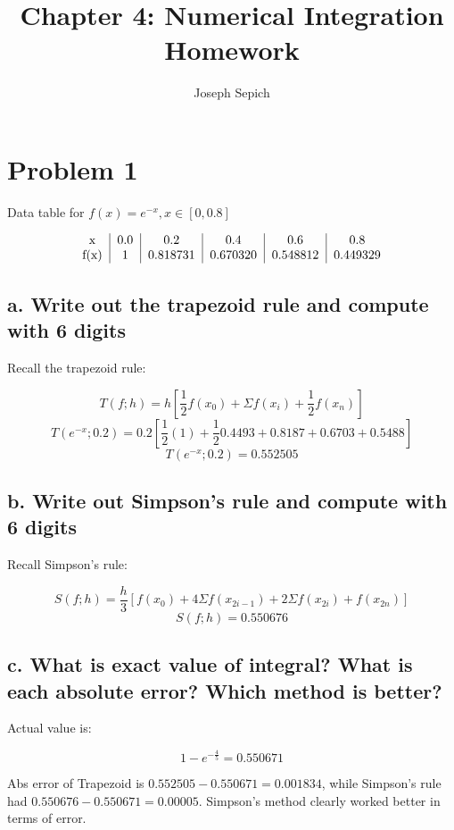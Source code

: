 \documentclass[]{article}
\title{Chapter 4: Numerical Integration Homework}
\subtitle{Joseph Sepich}
\author{}
\date{}
\begin{document}
\maketitle

{
\setcounter{tocdepth}{2}
\tableofcontents
}
\section{Problem 1}\label{problem-1}

Data table for \(f(x) = e^{-x}, x \in [0,0.8]\)

\[
\begin{tabular}{c|c|c|c|c|c}
x & 0.0 & 0.2 & 0.4 & 0.6 & 0.8 \\
f(x) & 1 & 0.818731 & 0.670320 & 0.548812 & 0.449329
\end{tabular}
\]

\subsection{a. Write out the trapezoid rule and compute with 6
digits}\label{a.-write-out-the-trapezoid-rule-and-compute-with-6-digits}

Recall the trapezoid rule:

\[T(f;h) = h[\frac12f(x_0) + \Sigma f(x_i) + \frac12 f(x_n)]\]
\[T(e^{-x};0.2) = 0.2[\frac12(1)+\frac120.4493 + 0.8187 + 0.6703 + 0.5488]\]
\[T(e^{-x};0.2) = 0.552505\]

\subsection{b. Write out Simpson's rule and compute with 6
digits}\label{b.-write-out-simpsons-rule-and-compute-with-6-digits}

Recall Simpson's rule:

\[S(f;h) = \frac{h}3[f(x_0) + 4\Sigma f(x_{2i-1}) + 2\Sigma f(x_{2i}) + f(x_{2n})]\]
\[S(f;h) = 0.550676\]

\subsection{c. What is exact value of integral? What is each absolute
error? Which method is
better?}\label{c.-what-is-exact-value-of-integral-what-is-each-absolute-error-which-method-is-better}

Actual value is:

\[1-e^{-\frac45} = 0.550671\]

Abs error of Trapezoid is \(0.552505 - 0.550671 = 0.001834\), while
Simpson's rule had \(0.550676 - 0.550671 = 0.00005\). Simpson's method
clearly worked better in terms of error.
\end{document}
